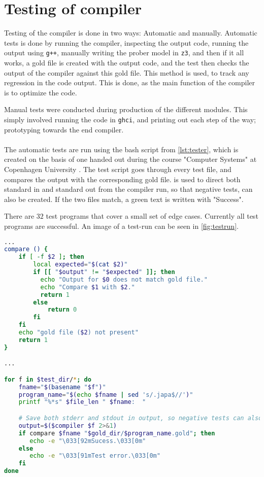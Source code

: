 \section{Testing of compiler } \label{sec:tests}
Testing of the compiler is done in two ways: Automatic and manually. Automatic tests is
done by running the compiler, inspecting the output code, running the output using \texttt{g++},
manually writing the prober model in \texttt{z3}, and then if it all works, a gold file is
created with the output code, and the test then checks the output of the compiler against this
gold file. This method is used, to track any regression in the code output. This is done, as
the main function of the compiler is to optimize the code.

Manual tests were conducted during production of the different modules. This simply involved
running the code in \texttt{ghci}, and printing out each step of the way; prototyping towards
the end compiler.
\\
\\
The automatic tests are run using the bash script from \autoref{lst:tester}, which is created
on the basis of one handed out during the course "Computer Systems" at Copenhagen University
\cite{compSys}. The test
script goes through every test \lan file, and compares the output with the corresponding
gold file.  is used to direct both standard in and standard out from the compiler
run, so that negative tests, can also be created. If the two files match, a green text
is written with "Success".

There are $32$ test programs that cover a small set of edge cases. Currently all test programs
are successful. An image of a test-run can be seen in \autoref{fig:testrun}.


\begin{lstlisting}[language=Bash, label={lst:tester}]
...
compare () {
    if [ -f $2 ]; then
        local expected="$(cat $2)"
        if [[ "$output" != "$expected" ]]; then
          echo "Output for $0 does not match gold file."
          echo "Compare $1 with $2."
          return 1
        else
            return 0
        fi
    fi
    echo "gold file ($2) not present"
    return 1
}

...

for f in $test_dir/*; do
    fname="$(basename "$f")"
    program_name="$(echo $fname | sed 's/.japa$//')"
    printf "%*s" $file_len " $fname:  "

    # Save both stderr and stdout in output, so negative tests can also be tested
    output=$($compiler $f 2>&1)
    if compare $fname "$gold_dir/$program_name.gold"; then
       echo -e "\033[92mSucess.\033[0m"
    else
       echo -e "\033[91mTest error.\033[0m"
    fi
done
\end{lstlisting}